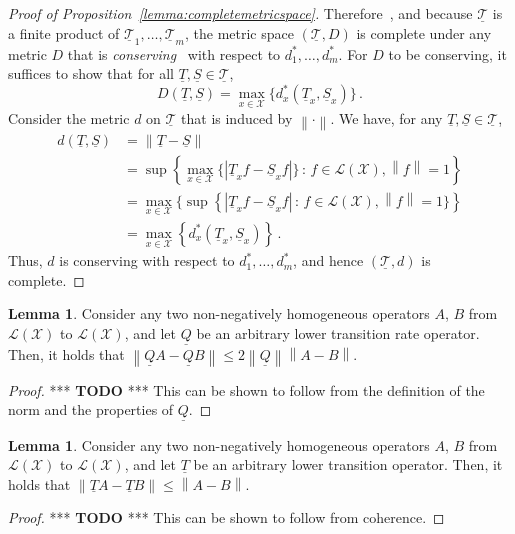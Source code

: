 \documentclass[10pt]{paper}
\theoremstyle{definition}
\newtheorem{lemma}[theorem]{Lemma}
\newcommand{\states}{\mathcal{X}}
\newcommand{\lt}{\underline{T}}
\newcommand{\gambles}{\mathcal{L}}
\newcommand{\gamblesX}{\gambles(\states)}
\newcommand{\lrate}{\underline{Q}}
\newcommand{\norm}[1]{\left\lVert #1 \right\rVert}
\newcommand{\abs}[1]{\left\vert #1 \right\vert}
\begin{document}
\begin{proof}[Proof of Proposition~\ref{lemma:completemetricspace}]
Therefore~\cite[Theorem 10.5.1]{OSearcoid:2006}, and because $\underline{\mathcal{T}}$ is a finite product of $\underline{\mathcal{T}}_1,\ldots,\underline{\mathcal{T}}_m$, the metric space $(\underline{\mathcal{T}},D)$ is complete under any metric $D$ that is \emph{conserving}~\cite[Definition 1.6.2]{OSearcoid:2006} with respect to $d_1^*,\ldots,d_m^*$. For $D$ to be conserving, it suffices to show that for all $\lt,\underline{S}\in\underline{\mathcal{T}}$,
\begin{equation*}
D(\lt, \underline{S}) = \max_{x\in\states}\bigl\{d_x^*(\lt_x, \underline{S}_x)\bigr\}\,.
\end{equation*}
Consider the metric $d$ on $\underline{\mathcal{T}}$ that is induced by $\norm{\cdot}$. We have, for any $\lt,\underline{S}\in\underline{\mathcal{T}}$, 
\begin{align*}
d(\lt,\underline{S}) &= \norm{\lt - \underline{S}} \\
 &= \sup\left\{ \max_{x\in\states}\{\abs{\lt_xf - \underline{S}_xf}\}\,:\,f\in\gamblesX, \norm{f}=1 \right\} \\
 &=  \max_{x\in\states}\bigl\{\sup\left\{\abs{\lt_xf - \underline{S}_xf}\,:\,f\in\gamblesX, \norm{f}=1 \bigr\}\right\} \\
 &=  \max_{x\in\states}\left\{d_x^*(\lt_x, \underline{S}_x)\right\}\,.
\end{align*}
Thus, $d$ is conserving with respect to $d_1^*,\ldots,d_m^*$, and hence $(\underline{\mathcal{T}},d)$ is complete.
\end{proof}

\begin{lemma}\label{lemma:differencenormofcoherenttransrate}
Consider any two non-negatively homogeneous operators $A$, $B$ from $\gamblesX$ to $\gamblesX$, and let $\lrate$ be an arbitrary lower transition rate operator. Then, it holds that $\norm{\lrate A-\lrate B}\leq 2\norm{\lrate}\norm{A-B}$.
\end{lemma}
\begin{proof}
*** {\bf TODO } *** This can be shown to follow from the definition of the norm and the properties of $\lrate$.
\end{proof}

\begin{lemma}\label{lemma:differencenormofcoherenttrans}
Consider any two non-negatively homogeneous operators $A$, $B$ from $\gamblesX$ to $\gamblesX$, and let $\lt$ be an arbitrary lower transition operator. Then, it holds that $\norm{\lt A-\lt B}\leq \norm{A-B}$.
\end{lemma}
\begin{proof}
*** {\bf TODO } *** This can be shown to follow from coherence.
\end{proof}
\end{document}
